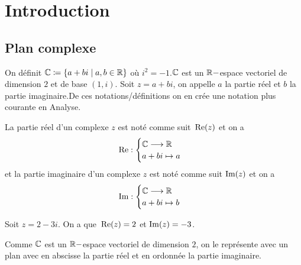 \chapter{Introduction}
\section{Plan complexe}
On définit $\mathbb{C}\coloneqq\left\{a+b i\mid a,b\in\mathbb{R}\right\}$ où $i^2=-1$.$\mathbb{C}$ est un $\mathbb{R}-$espace vectoriel de dimension $2$ et de base $(1,i)$. Soit $z=a+bi$, on appelle $a$ la partie réel et $b$ la partie imaginaire.De ces notations/définitions on en crée une notation plus courante en Analyse.
\begin{definition}
    La partie réel d'un complexe $z$ est noté comme suit ${\,\operatorname{Re}}(z)$ et on a 
    $$
    {\,\operatorname{Re}}:\begin{cases}
        \mathbb{C}\longrightarrow\mathbb{R}\\
        a+bi\mapsto a
    \end{cases}$$
    et la partie imaginaire d'un complexe $z$ est noté comme suit $\operatorname{Im}(z)$ et on a 
    $$
    \operatorname{Im}:\begin{cases}
        \mathbb{C}\longrightarrow\mathbb{R}\\
        a+bi\mapsto b
    \end{cases}$$
\end{definition}
\begin{exemple}
    Soit $z=2-3i$. On a que ${\,\operatorname{Re}}(z)=2$ et $\operatorname{Im}(z)=-3$.
\end{exemple}

Comme $\mathbb{C}$ est un $\mathbb{R}-$espace vectoriel de dimension $2$, on le représente avec un plan avec en abscisse la partie réel et en ordonnée la partie imaginaire.

\begin{center}
\\
\end{center}
\vspace{1cm}

